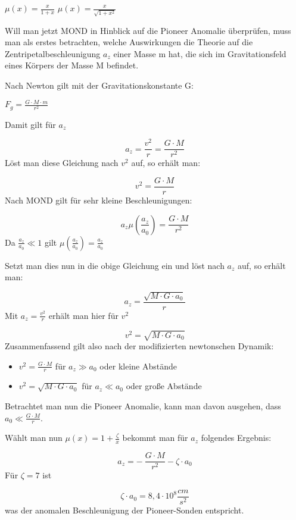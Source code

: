 {\centering  $\mu (x)=\frac{x}{1+x}$ $\mu
(x)=\frac{x}{\sqrt{1+x^{2}}}$\par}

Will man jetzt MOND in Hinblick auf die Pioneer Anomalie \cite{Turyshev2010}
überprüfen, muss man als erstes betrachten, welche Auswirkungen die
Theorie auf die Zentripetalbeschleunigung  $a_{z}$ einer Masse m hat,
die sich im Gravitationsfeld eines Körpers der Masse M befindet.

Nach Newton gilt mit der Gravitationskonstante G:

{\centering  $F_{g}=\frac{G\cdot {M\cdot m}}{r^{2}}$\par}

Damit gilt für  $a_{z}$

\begin{equation*}
a_{z}=\frac{v^{2}}{r}=\frac{G\cdot {M}}{r^{2}}
\end{equation*}
Löst man diese Gleichung nach  $v^{2}$ auf, so erhält man:

\begin{equation*}
v^{2}=\frac{G\cdot M}{r}
\end{equation*}
Nach MOND gilt für sehr kleine Beschleunigungen:

\begin{equation*}
a_{z}\mu (\frac{a_{z}}{a_{0}})=\frac{G\cdot {M}}{r^{2}}
\end{equation*}
Da  $\frac{a_{z}}{a_{0}}\ll 1$ gilt  $\mu
(\frac{a_{z}}{a_{0}})=\frac{a_{z}}{a_{0}}$

Setzt man dies nun in die obige Gleichung ein und löst nach  $a_{z}$
auf, so erhält man:

\begin{equation*}
a_{z}=\frac{\sqrt{M\cdot G\cdot a_{0}}}{r}
\end{equation*}
Mit  $a_{z}=\frac{v^{2}}{r}$ erhält man hier für  $v^{2}$

\begin{equation*}
v^{2}=\sqrt{M\cdot G\cdot a_{0}}
\end{equation*}
Zusammenfassend gilt also nach der modifizierten newtonschen Dynamik:

\begin{itemize}
\item  $v^{2}=\frac{G\cdot M}{r}$ für  $a_{z}\gg a_{0}$ oder kleine
Abstände
\item  $v^{2}=\sqrt{M\cdot G\cdot a_{0}}$ für  $a_{z}\ll a_{0}$ oder
große Abstände
\end{itemize}
Betrachtet man nun die Pioneer Anomalie, kann man davon ausgehen, dass 
$a_{0}\ll \frac{G\cdot M}{r}$.

Wählt man nun  $\mu (x)=1+\frac{\zeta }{x}$ bekommt man für  $a_{z}$
folgendes Ergebnis:

\begin{equation*}
a_{z}=-\ \frac{G\cdot M}{r^{2}}-\zeta \cdot a_{0}
\end{equation*}
Für  $\zeta =7$ ist 

\begin{equation*}
\zeta \cdot a_{0}=8,4\cdot 10^{8}\frac{\mathit{cm}}{s^{2}}
\end{equation*}
was der anomalen Beschleunigung der Pioneer-Sonden entspricht.